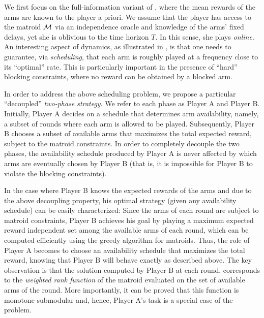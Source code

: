 We first focus on the full-information variant of \mbb, where the mean rewards of the arms are known to the player a priori. We assume that the player has access to the matroid $\operatorname{\mathcal{M}}$ via an independence oracle and knowledge of the arms' fixed delays, yet she is oblivious to the time horizon $T$. In this sense, she plays {\em online}. An interesting aspect of dynamics, as illustrated in \cite{KI18, BSSS19, BPCS20}, is that one needs to guarantee, via {\em scheduling}, that each arm is roughly played at a frequency close to its ``optimal'' rate. This is particularly important in the presence of ``hard'' blocking constraints, where no reward can be obtained by a blocked arm. 

In order to address the above scheduling problem, we propose a particular  ``decoupled'' {\em two-phase strategy}. We refer to each phase as Player A and Player B. Initially, Player A decides on a schedule that determines arm availability, namely, a subset of rounds where each arm is allowed to be played. Subsequently, Player B chooses a subset of available arms that maximizes the total expected reward, subject to the matroid constraints. In order to completely decouple the two phases, the availability schedule produced by Player A is never affected by which arms are eventually chosen by Player B (that is, it is impossible for Player B to violate the blocking constraints). 

In the case where Player B knows the expected rewards of the arms and due to the above decoupling property, his optimal strategy (given any availability schedule) can be easily characterized: Since the arms of each round are subject to matroid constraints, Player B achieves his goal by playing a maximum expected reward independent set among the available arms of each round, which can be computed efficiently using the greedy algorithm for matroids. Thus, the role of Player A becomes to choose an availability schedule that maximizes the total reward, knowing that Player B will behave exactly as described above. The key observation is that the solution computed by Player B at each round, corresponds to the {\em weighted rank function} of the matroid evaluated on the set of available arms of the round. More importantly, it can be proved that this function is monotone submodular and, hence, Player A's task is a special case of the \rsm problem. 


